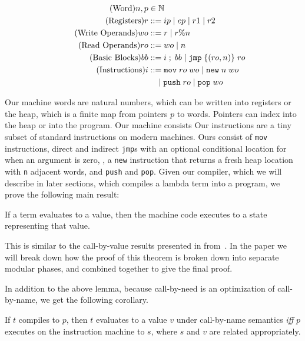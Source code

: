 \begin{align}
  \tag{Word}   n, p &\in \mathbb{N} \\
  \tag{Registers} r &::= ip \; | \; ep \; | \; r1 \; | \; r2  \\
  \tag{Write Operands}  wo &::= r \; | \; r\%n \\
  \tag{Read Operands}  ro &::= wo \; | \; n \\
  \tag{Basic Blocks} bb &::= i \; ; \; bb \; 
                       | \; \texttt{jmp} \; \{(ro, n)\} \; ro \;  \\
  \tag{Instructions} i &::= \texttt{mov} \; ro \; wo \; 
                       | \; \texttt{new} \; n \; wo \; \\
  \notag   & \quad \;  | \; \texttt{push} \; ro \; 
                       | \; \texttt{pop} \; wo \\
\end{align}

Our machine words are natural numbers, which can be written into registers or
the heap, which is a finite map from pointers $p$ to words. Pointers can index
into the heap or into the program. Our machine consists Our instructions are a tiny subset of
standard instructions on modern machines. Ours consist of \texttt{mov}
instructions, direct and indirect \texttt{jmp}s with an optional conditional
location for when an argument is zero, , a \texttt{new} instruction that
returns a fresh heap location with \texttt{n} adjacent words, and \texttt{push}
and \texttt{pop}. Given our compiler, which we will describe in later sections,
which compiles a lambda term into a program, we prove the following main
result:

\begin{theorem}
If a term evaluates to a value, then the machine code executes to a state
representing that value. 
\end{theorem}

This is similar to the call-by-value results presented in
from~\cite{chlipala2007certified}. In the paper we will break down how the proof
of this theorem is broken down into separate modular phases, and combined
together to give the final proof. 

In addition to the above lemma, because call-by-need is an optimization of
call-by-name, we get the following corollary.

\begin{corollary}
If $t$ compiles to $p$, then $t$ evaluates to a value $v$ under call-by-name
semantics \emph{iff} $p$ executes on the instruction machine to $s$, where $s$
and $v$ are related appropriately.
\end{corollary}

